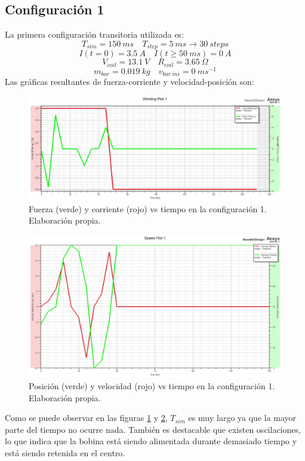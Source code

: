 \subsection*{Configuración 1}
La primera configuración transitoria utilizada es:
\[
T_{sim}=150~ms \quad T_{step}=5~ms \to 30~steps
\]
\[
I(t=0)=3.5~A \quad I(t\geq 50~ms)=0~A
\]
\[
V_{coil}=13.1~V \quad R_{coil}=3.65~\Omega
\]
\[
m_{bar}=0.019~kg \quad v_{bar~ini}=0~ms^{-1}
\]
Las gráficas resultantes de fuerza-corriente y velocidad-posición son:
\begin{figure}[H]
    \centering
    \includegraphics[width=13cm]{FigurasMemoria/S1CurrentForce.jpg}
    \caption{Fuerza (verde) y corriente (rojo) vs tiempo en la configuración 1. Elaboración propia.}
    \label{fig:S1CurrentForce} %
\end{figure}
\begin{figure}[H]
    \centering
    \includegraphics[width=13cm]{FigurasMemoria/S1SpeedPosition.jpg}
    \caption{Posición (verde) y velocidad (rojo) vs tiempo en la configuración 1. Elaboración propia.}
    \label{fig:S1SpeedPosition} %
\end{figure}
Como se puede observar en las figuras \ref{fig:S1CurrentForce} y \ref{fig:S1SpeedPosition}, \(T_{sim}\) es muy largo ya que la mayor parte del tiempo no ocurre nada. También es destacable que existen oscilaciones, lo que indica que la bobina está siendo alimentada durante demasiado tiempo y está siendo retenida en el centro.


